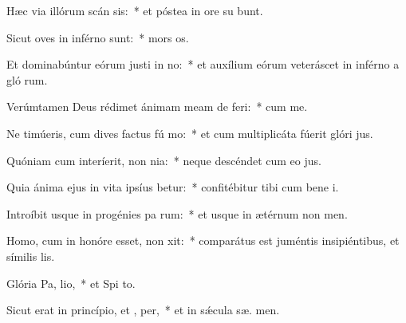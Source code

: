 \item Hæc via illórum scán sis:~* et póstea in ore su bunt.
\item Sicut oves in inférno  sunt:~* mors  os.
\item Et dominabúntur eórum justi in no:~* et auxílium eórum veteráscet in inférno a gló rum.
\item Verúmtamen Deus rédimet ánimam meam de  feri:~* cum  me.
\item Ne timúeris, cum dives factus fú mo:~* et cum multiplicáta fúerit glóri  jus.
\item Quóniam cum interíerit, non  nia:~* neque descéndet cum eo  jus.
\item Quia ánima ejus in vita ipsíus betur:~* confitébitur tibi cum bene i.
\item Introíbit usque in progénies pa rum:~* et usque in ætérnum non  men.
\item Homo, cum in honóre esset, non xit:~* comparátus est juméntis insipiéntibus, et símilis   lis.
\item Glória Pa,  lio,~* et Spi to.
\item Sicut erat in princípio, et ,  per,~* et in sǽcula sæ. men.

